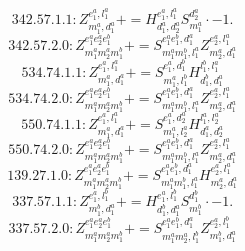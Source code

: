 \documentclass[letterpaper,10pt,fleqn,leqno,onecolumn]{article}
\begin{document}
\begin{equation} \;\;\;\;\;\;  342.57.1.1: Z^{e_{1}^{a},l_{1}^{a}}_{m_{1}^{a},d_{1}^{a}}+=H^{e_{1}^{a},l_{1}^{a}}_{d_{1}^{a},d_{2}^{a}}S^{d_{2}^{a}}_{m_{1}^{a}}\cdot -1. \end{equation}
\begin{equation} \;\;\;\;\;\;  342.57.2.0: Z^{e_{1}^{a}e_{2}^{a}e_{1}^{b}}_{m_{1}^{a}m_{2}^{a}m_{1}^{b}}+=S^{e_{1}^{a}e_{1}^{b},d_{1}^{a}}_{m_{1}^{a}m_{1}^{b},l_{1}^{a}}Z^{e_{2}^{a},l_{1}^{a}}_{m_{2}^{a},d_{1}^{a}} \end{equation}
\begin{equation} \;\;\;\;\;\;  534.74.1.1: Z^{e_{1}^{a},l_{1}^{a}}_{m_{1}^{a},d_{1}^{a}}+=S^{e_{1}^{a},d_{1}^{b}}_{m_{1}^{a},l_{1}^{b}}H^{l_{1}^{b},l_{1}^{a}}_{d_{1}^{b},d_{1}^{a}} \end{equation}
\begin{equation} \;\;\;\;\;\;  534.74.2.0: Z^{e_{1}^{a}e_{2}^{a}e_{1}^{b}}_{m_{1}^{a}m_{2}^{a}m_{1}^{b}}+=S^{e_{1}^{a}e_{1}^{b},d_{1}^{a}}_{m_{1}^{a}m_{1}^{b},l_{1}^{a}}Z^{e_{2}^{a},l_{1}^{a}}_{m_{2}^{a},d_{1}^{a}} \end{equation}
\begin{equation} \;\;\;\;\;\;  550.74.1.1: Z^{e_{1}^{a},l_{1}^{a}}_{m_{1}^{a},d_{1}^{a}}+=S^{e_{1}^{a},d_{2}^{a}}_{m_{1}^{a},l_{2}^{a}}H^{l_{1}^{a},l_{2}^{a}}_{d_{1}^{a},d_{2}^{a}} \end{equation}
\begin{equation} \;\;\;\;\;\;  550.74.2.0: Z^{e_{1}^{a}e_{2}^{a}e_{1}^{b}}_{m_{1}^{a}m_{2}^{a}m_{1}^{b}}+=S^{e_{1}^{a}e_{1}^{b},d_{1}^{a}}_{m_{1}^{a}m_{1}^{b},l_{1}^{a}}Z^{e_{2}^{a},l_{1}^{a}}_{m_{2}^{a},d_{1}^{a}} \end{equation}
\begin{equation} \;\;\;\;\;\;  139.27.1.0: Z^{e_{1}^{a}e_{2}^{a}e_{1}^{b}}_{m_{1}^{a}m_{2}^{a}m_{1}^{b}}+=S^{e_{1}^{a}e_{1}^{b},d_{1}^{a}}_{m_{1}^{a}m_{1}^{b},l_{1}^{a}}H^{e_{2}^{a},l_{1}^{a}}_{m_{2}^{a},d_{1}^{a}} \end{equation}
\begin{equation} \;\;\;\;\;\;  337.57.1.1: Z^{e_{1}^{a},l_{1}^{b}}_{m_{1}^{b},d_{1}^{a}}+=H^{e_{1}^{a},l_{1}^{b}}_{d_{1}^{b},d_{1}^{a}}S^{d_{1}^{b}}_{m_{1}^{b}}\cdot -1. \end{equation}
\begin{equation} \;\;\;\;\;\;  337.57.2.0: Z^{e_{1}^{a}e_{2}^{a}e_{1}^{b}}_{m_{1}^{a}m_{2}^{a}m_{1}^{b}}+=S^{e_{1}^{a}e_{1}^{b},d_{1}^{a}}_{m_{1}^{a}m_{2}^{a},l_{1}^{b}}Z^{e_{2}^{a},l_{1}^{b}}_{m_{1}^{b},d_{1}^{a}} \end{equation}
\end{document}
